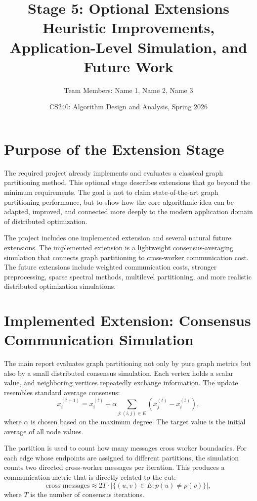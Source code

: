 \documentclass[11pt]{article}
\title{\textbf{Stage 5: Optional Extensions}\\
Heuristic Improvements, Application-Level Simulation, and Future Work}
\author{Team Members: Name 1, Name 2, Name 3}
\date{CS240: Algorithm Design and Analysis, Spring 2026}
\begin{document}
\maketitle

\section{Purpose of the Extension Stage}

The required project already implements and evaluates a classical graph
partitioning method. This optional stage describes extensions that go beyond
the minimum requirements. The goal is not to claim state-of-the-art graph
partitioning performance, but to show how the core algorithmic idea can be
adapted, improved, and connected more deeply to the modern application domain
of distributed optimization.

The project includes one implemented extension and several natural future
extensions. The implemented extension is a lightweight consensus-averaging
simulation that connects graph partitioning to cross-worker communication
cost. The future extensions include weighted communication costs, stronger
preprocessing, sparse spectral methods, multilevel partitioning, and more
realistic distributed optimization simulations.

\section{Implemented Extension: Consensus Communication Simulation}

The main report evaluates graph partitioning not only by pure graph metrics
but also by a small distributed consensus simulation. Each vertex holds a
scalar value, and neighboring vertices repeatedly exchange information. The
update resembles standard average consensus:
\[
    x_i^{(t+1)}
    =
    x_i^{(t)}
    +
    \alpha
    \sum_{j:(i,j)\in E}
    \left(x_j^{(t)}-x_i^{(t)}\right),
\]
where $\alpha$ is chosen based on the maximum degree. The target value is the
initial average of all node values.

The partition is used to count how many messages cross worker boundaries. For
each edge whose endpoints are assigned to different partitions, the simulation
counts two directed cross-worker messages per iteration. This produces a
communication metric that is directly related to the cut:
\[
    \text{cross messages}
    \approx
    2T \cdot |\{(u,v)\in E:p(u)\neq p(v)\}|,
\]
where $T$ is the number of consensus iterations.
\end{document}
